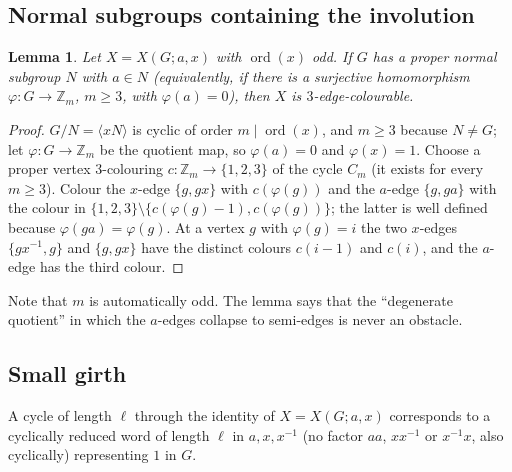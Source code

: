 \documentclass[11pt,a4paper]{article}
\newtheorem{lemma}[theorem]{Lemma}
\theoremstyle{definition}
\theoremstyle{remark}
\newcommand{\ord}{\operatorname{ord}}
\newcommand{\ZZ}{\mathbb{Z}}
\newcommand{\X}[3]{X(#1;#2,#3)}
\begin{document}
\subsection{Normal subgroups containing the involution}
\begin{lemma}\label{lem:a-in-N}
Let $X=\X{G}{a}{x}$ with $\ord(x)$ odd.  If $G$ has a proper normal subgroup $N$ with $a\in N$ (equivalently, if there is a surjective homomorphism $\varphi\colon G\to\ZZ_m$, $m\ge3$, with $\varphi(a)=0$), then $X$ is $3$-edge-colourable.
\end{lemma}
\begin{proof}
$G/N=\langle xN\rangle$ is cyclic of order $m\mid\ord(x)$, and $m\ge3$ because $N\ne G$; let $\varphi\colon G\to\ZZ_m$ be the quotient map, so $\varphi(a)=0$ and $\varphi(x)=1$.  Choose a proper vertex $3$-colouring $c\colon\ZZ_m\to\{1,2,3\}$ of the cycle $C_m$ (it exists for every $m\ge3$).  Colour the $x$-edge $\{g,gx\}$ with $c(\varphi(g))$ and the $a$-edge $\{g,ga\}$ with the colour in $\{1,2,3\}\setminus\{c(\varphi(g)-1),c(\varphi(g))\}$; the latter is well defined because $\varphi(ga)=\varphi(g)$.  At a vertex $g$ with $\varphi(g)=i$ the two $x$-edges $\{gx^{-1},g\}$ and $\{g,gx\}$ have the distinct colours $c(i-1)$ and $c(i)$, and the $a$-edge has the third colour.
\end{proof}

Note that $m$ is automatically odd.  The lemma says that the ``degenerate quotient'' in which the $a$-edges collapse to semi-edges is never an obstacle.

\subsection{Small girth}\label{sec:girth}
A cycle of length $\ell$ through the identity of $X=\X{G}{a}{x}$ corresponds to a cyclically reduced word of length $\ell$ in $a,x,x^{-1}$ (no factor $aa$, $xx^{-1}$ or $x^{-1}x$, also cyclically) representing $1$ in $G$.
\end{document}
